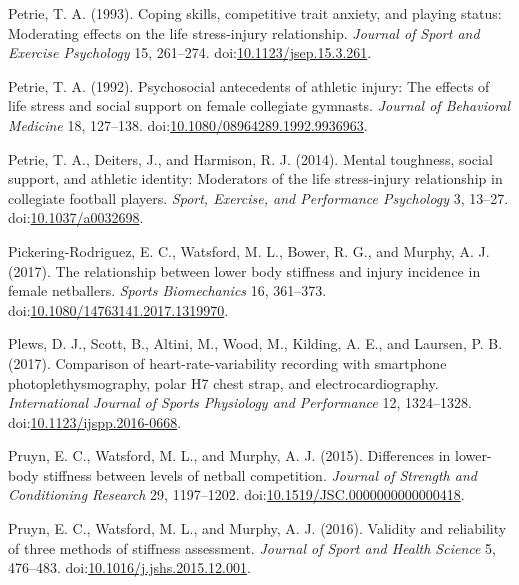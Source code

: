 \documentclass[
  english,
  man]{apa6}
\newlength{\cslhangindent}
\newenvironment{cslreferences}%
  {\setlength{\parindent}{0pt}%
  \everypar{\setlength{\hangindent}{\cslhangindent}}\ignorespaces}%
  {\par}
\begin{document}
\begin{cslreferences}
\leavevmode\hypertarget{ref-Petrie1993}{}%
Petrie, T. A. (1993). Coping skills, competitive trait anxiety, and playing status: Moderating effects on the life stress-injury relationship. \emph{Journal of Sport and Exercise Psychology} 15, 261--274. doi:\href{https://doi.org/10.1123/jsep.15.3.261}{10.1123/jsep.15.3.261}.

\leavevmode\hypertarget{ref-Petrie1992}{}%
Petrie, T. A. (1992). Psychosocial antecedents of athletic injury: The effects of life stress and social support on female collegiate gymnasts. \emph{Journal of Behavioral Medicine} 18, 127--138. doi:\href{https://doi.org/10.1080/08964289.1992.9936963}{10.1080/08964289.1992.9936963}.

\leavevmode\hypertarget{ref-Petrie2014}{}%
Petrie, T. A., Deiters, J., and Harmison, R. J. (2014). Mental toughness, social support, and athletic identity: Moderators of the life stress-injury relationship in collegiate football players. \emph{Sport, Exercise, and Performance Psychology} 3, 13--27. doi:\href{https://doi.org/10.1037/a0032698}{10.1037/a0032698}.

\leavevmode\hypertarget{ref-PickeringRodriguez2017}{}%
Pickering-Rodriguez, E. C., Watsford, M. L., Bower, R. G., and Murphy, A. J. (2017). The relationship between lower body stiffness and injury incidence in female netballers. \emph{Sports Biomechanics} 16, 361--373. doi:\href{https://doi.org/10.1080/14763141.2017.1319970}{10.1080/14763141.2017.1319970}.

\leavevmode\hypertarget{ref-Plews2017}{}%
Plews, D. J., Scott, B., Altini, M., Wood, M., Kilding, A. E., and Laursen, P. B. (2017). Comparison of heart-rate-variability recording with smartphone photoplethysmography, polar H7 chest strap, and electrocardiography. \emph{International Journal of Sports Physiology and Performance} 12, 1324--1328. doi:\href{https://doi.org/10.1123/ijspp.2016-0668}{10.1123/ijspp.2016-0668}.

\leavevmode\hypertarget{ref-Pruyn2015}{}%
Pruyn, E. C., Watsford, M. L., and Murphy, A. J. (2015). Differences in lower-body stiffness between levels of netball competition. \emph{Journal of Strength and Conditioning Research} 29, 1197--1202. doi:\href{https://doi.org/10.1519/JSC.0000000000000418}{10.1519/JSC.0000000000000418}.

\leavevmode\hypertarget{ref-Pruyn2016}{}%
Pruyn, E. C., Watsford, M. L., and Murphy, A. J. (2016). Validity and reliability of three methods of stiffness assessment. \emph{Journal of Sport and Health Science} 5, 476--483. doi:\href{https://doi.org/10.1016/j.jshs.2015.12.001}{10.1016/j.jshs.2015.12.001}.


\end{cslreferences}
\end{document}
